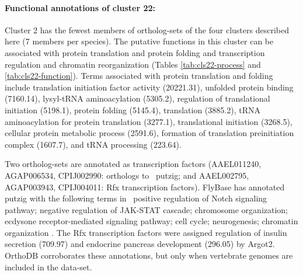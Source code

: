\paragraph*{Functional annotations of cluster 22:}






Cluster 2 has the fewest members of ortholog-sets of the four clusters described here (7 members per species).
%
The putative functions in this cluster can be associated with protein translation and protein folding and transcription regulation and chromatin reorganization (Tables \ref{tab:cls22-process} and \ref{tab:cls22-function}).
%
Terms associated with protein translation and folding include translation initiation factor activity (20221.31), unfolded protein binding (7160.14), lysyl-tRNA aminoacylation (5305.2), regulation of translational initiation (5198.1), protein folding (5145.4), translation (3885.2), tRNA aminoacylation for protein translation (3277.1), translational initiation (3268.5), cellular protein metabolic process (2591.6), formation of translation preinitiation complex (1607.7), and tRNA processing (223.64).




Two ortholog-sets are annotated as transcription factors (AAEL011240, AGAP006534, CPIJ002990: orthologs to \Dm\ putzig; and AAEL002795, AGAP003943, CPIJ004011: Rfx transcription factors).
%
FlyBase has annotated putzig with the following terms in \Dm\, positive regulation of Notch signaling pathway; negative regulation of JAK-STAT cascade; chromosome organization; ecdysone receptor-mediated signaling pathway; cell cycle; neurogenesis; chromatin organization \cite{Marygold2013}.
%
The Rfx transcription factors were assigned regulation of insulin secretion (709.97) and endocrine pancreas development (296.05) by \gls{Argot2}.
%
OrthoDB corroborates these annotations, but only when vertebrate genomes are included in the data-set.

